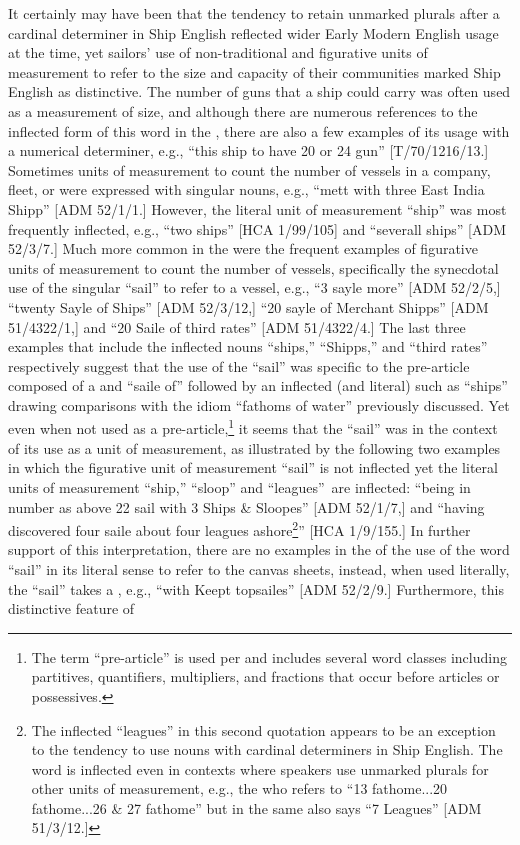 It certainly may have been that the tendency to retain unmarked plurals after a cardinal determiner in Ship English reflected wider Early Modern English usage at the time, yet sailors’ use of non-traditional and figurative units of measurement to refer to the size and capacity of their communities marked Ship English as distinctive. The number of guns that a ship could carry was often used as a measurement of size, and although there are numerous references to the inflected form of this word in the , there are also a few examples of its  usage with a numerical determiner, e.g., “this ship to have 20 or 24 gun” [T/70/1216/13.] Sometimes units of measurement to count the number of vessels in a company, fleet, or  were expressed with singular nouns, e.g., “mett with three East India Shipp” [ADM 52/1/1.] However, the literal unit of measurement “ship” was most frequently inflected, e.g., “two ships” [HCA 1/99/105] and “severall ships” [ADM 52/3/7.] Much more common in the  were the frequent examples of  figurative units of measurement to count the number of vessels, specifically the synecdotal use of the singular  “sail” to refer to a vessel, e.g., “3 sayle more” [ADM 52/2/5,] “twenty Sayle of Ships” [ADM 52/3/12,] “20 sayle of Merchant Shipps” [ADM 51/4322/1,] and “20 Saile of third rates” [ADM 51/4322/4.] The last three examples that include the inflected nouns “ships,” “Shipps,” and “third rates” respectively suggest that the use of the  “sail” was specific to the pre-article composed of a  and “saile of” followed by an inflected (and literal)  such as “ships” drawing comparisons with the idiom “fathoms of water” previously discussed. Yet even when not used as a pre-article,\footnote{The term “pre-article” is used per \citet[76]{Morenberg2010} and includes several word classes including partitives, quantifiers, multipliers, and fractions that occur before articles or possessives.} it seems that the  “sail” was  in the context of its use as a unit of measurement, as illustrated by the following two examples in which the figurative unit of measurement “sail” is not inflected yet the literal units of measurement “ship,” “sloop” and “leagues”~are inflected: “being in number as above 22 sail with 3  Ships \& Sloopes” [ADM 52/1/7,] and “having discovered four saile about four leagues ashore\footnote{The inflected  “leagues” in this second quotation appears to be an exception to the tendency to use  nouns with cardinal determiners in Ship English. The word is inflected even in contexts where speakers use unmarked plurals for other units of measurement, e.g., the  who refers to “13 fathome...20 fathome...26 \& 27 fathome” but in the same  also says “7 Leagues” [ADM 51/3/12.]}” [HCA 1/9/155.] In further support of this interpretation, there are no examples in the  of the  use of the word “sail” in its literal sense to refer to the  canvas sheets, instead, when used literally, the  “sail” takes a , e.g., “with Keept topsailes” [ADM 52/2/9.] Furthermore, this distinctive feature of 